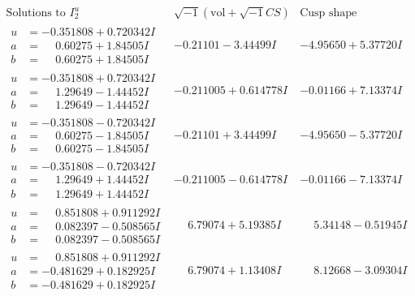 \documentclass[1p]{elsarticle_modified}
\theoremstyle{definition}
\newcommand{\I}{\sqrt{-1}}
\begin{document}
$$\begin{array}{c|c|c}  
\text{Solutions to }I^u_{2}& \I (\text{vol} + \sqrt{-1}CS) & \text{Cusp shape}\\
 \hline 
\begin{aligned}
u &= -0.351808 + 0.720342 I \\
a &= \phantom{-}0.60275 + 1.84505 I \\
b &= \phantom{-}0.60275 + 1.84505 I\end{aligned}
 & -0.21101 - 3.44499 I & -4.95650 + 5.37720 I \\ \hline\begin{aligned}
u &= -0.351808 + 0.720342 I \\
a &= \phantom{-}1.29649 - 1.44452 I \\
b &= \phantom{-}1.29649 - 1.44452 I\end{aligned}
 & -0.211005 + 0.614778 I & -0.01166 + 7.13374 I \\ \hline\begin{aligned}
u &= -0.351808 - 0.720342 I \\
a &= \phantom{-}0.60275 - 1.84505 I \\
b &= \phantom{-}0.60275 - 1.84505 I\end{aligned}
 & -0.21101 + 3.44499 I & -4.95650 - 5.37720 I \\ \hline\begin{aligned}
u &= -0.351808 - 0.720342 I \\
a &= \phantom{-}1.29649 + 1.44452 I \\
b &= \phantom{-}1.29649 + 1.44452 I\end{aligned}
 & -0.211005 - 0.614778 I & -0.01166 - 7.13374 I \\ \hline\begin{aligned}
u &= \phantom{-}0.851808 + 0.911292 I \\
a &= \phantom{-}0.082397 - 0.508565 I \\
b &= \phantom{-}0.082397 - 0.508565 I\end{aligned}
 & \phantom{-}6.79074 + 5.19385 I & \phantom{-}5.34148 - 0.51945 I \\ \hline\begin{aligned}
u &= \phantom{-}0.851808 + 0.911292 I \\
a &= -0.481629 + 0.182925 I \\
b &= -0.481629 + 0.182925 I\end{aligned}
 & \phantom{-}6.79074 + 1.13408 I & \phantom{-}8.12668 - 3.09304 I \\ \hline\begin{aligned}

\end{aligned}
\end{array}$$
\end{document}
